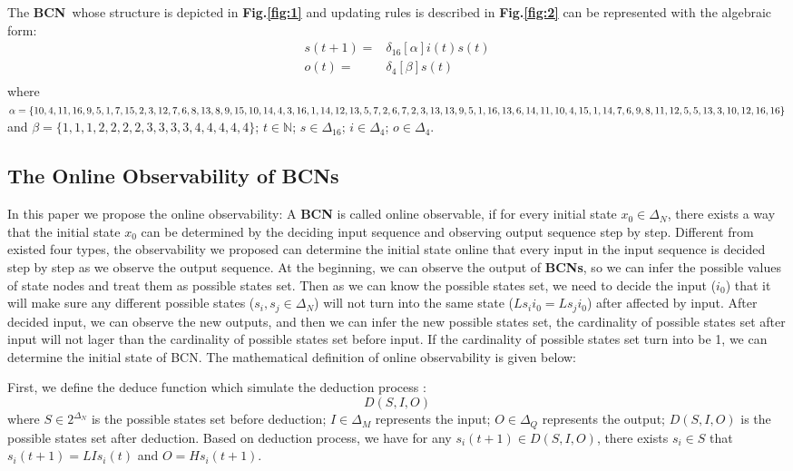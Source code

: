 \documentclass[letterpaper, 10 pt, conference]{ieeeconf}  %
\def \BCN {{\bf BCN}}
\begin{document}
The \BCN\ whose structure is depicted in {\bf Fig.\ref{fig:1}} and updating rules is described in {\bf Fig.\ref{fig:2}} can be represented with the algebraic form:
\begin{equation}
\begin{split}
s(t+1) =&\delta_{16}[\alpha]i(t)s(t)\\
o(t) =&\delta_4[\beta]s(t)\\
\end{split}
\end{equation}
where $\alpha=\{10,4,11,16,9,5,1, 7,15,2,3,12,7,6,8,13,8,9,\\15,10,14,4,3,16,1,14,12,13,5,7,2,6,7,2,3,13,13,9,5,1,\\16,13 ,6,14,11,10,4,15,1,14 ,7,6,9 ,8,11,12,5,5,13,3,10,\\12,16,16\}$ and $\beta=\{1,1,1,2,2,2,2,3,3,3,3,4,4,4,4,4\}$; $t\in \mathbb{N}$; $s\in \Delta_{16}$; $i\in \Delta_4$; $o\in \Delta_4$.


\subsection{The Online Observability of BCNs}
In this paper we propose the online observability: A {\bf BCN} is called online observable, if for every initial state $x_0 \in \Delta_N$, there exists a way that the initial state $x_0 $ can be determined by the deciding input sequence and observing output sequence step by step. Different from existed four types, the observability we proposed can determine the initial state online that every input in the input sequence is decided step by step as we observe the output sequence. At the beginning, we can observe the output of {\bf BCNs}, so we can infer the possible values of state nodes and treat them as possible states set. Then as we can know the possible states set, we need to decide the input ($i_0$) that it will make sure any different possible states ($s_i, s_j\in \Delta_N$) will not turn into the same state ($Ls_i i_0=Ls_j i_0$) after affected by input. After decided input, we can observe the new outputs, and then we can infer the new possible states set, the cardinality of possible states set after input will not lager than the cardinality of possible states set before input. If the cardinality of possible states set turn into be 1, we can determine the initial state of BCN. The mathematical definition of online observability is given below:

First, we define the deduce function  which simulate the deduction process :
$$D\left(S, I, O\right)$$
where $S\in 2^{\Delta_N}$ is the possible states set before deduction; $I\in\Delta_M$ represents the input; $O\in\Delta_Q$ represents the output; $D\left(S, I, O\right)$ is the possible states set after deduction. Based on deduction process, we have for any $s_i(t+1)\in D\left(S, I, O\right)$, there exists $s_i\in S$ that $s_i(t+1)=LIs_i(t)$ and $O=Hs_i(t+1)$.
\end{document}
